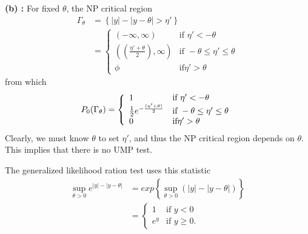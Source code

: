 \documentclass[a4paper,english,12pt]{article}
\begin{document}
\textbf{(b) : } For fixed $\theta$, the NP critical region
\begin{align*}
\Gamma_{\theta}&=\left\{|y|-|y-\theta|>\eta'\right\} \\
			  &=\left\{
					\begin{array}{ll}
						(-\infty,\infty)  & \mbox{if } \eta'<-\theta\\
						((\frac{\eta'+\theta}{2}),\infty) & \mbox{if } -\theta\leq\eta'\leq\theta\\
						\phi & \mbox{if} \eta'>\theta
					\end{array}
				\right.
\end{align*}
from which
\begin{equation*}
\mathnormal{P}_0(\Gamma_{\theta})=\left\{
					\begin{array}{ll}
						1 & \mbox{if } \eta'<-\theta\\
						\frac{1}{2}e^{-\frac{(\eta'+\theta)}{2}} & \mbox{if } -\theta\leq\eta'\leq\theta\\
						 0 & \mbox{if} \eta'>\theta
					\end{array}
				\right.
\end{equation*}
Clearly, we must know $\theta$ to set $\eta'$, and thus the NP critical region depends on $\theta$. This implies that there is no UMP test.

The generalized likelihood ration test uses this statistic 
\begin{align*}
\sup_{\theta>0}e^{|y|-|y-\theta|}&=exp\left\{\sup_{\theta>0}(|y|-|y-\theta|)\right\} \\
			  &=\left\{
					\begin{array}{ll}
						1  & \mbox{if } y<0\\
						e^{y} & \mbox{if } y\geq 0.
					\end{array}
				\right.
\end{align*}
\end{document}
